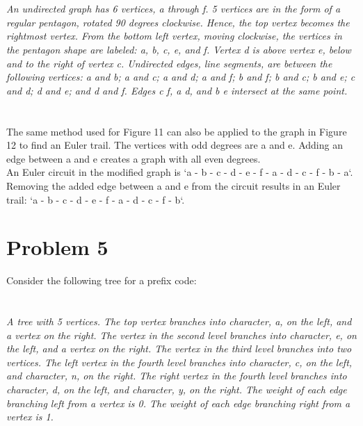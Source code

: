 \documentclass{amsart}
\theoremstyle{definition}
\theoremstyle{Exercise}
\theoremstyle{remark}
\theoremstyle{rule}
\numberwithin{equation}{section}
\begin{document}
\begin{enumerate}[label=(\alph*)]
\begin{enumerate}[label=(\roman*)]
{}
\\\\
{\color{blue}{\bf Figure 12:} \emph{An undirected graph has 6 vertices, a through f. 5 vertices are in the form of a regular pentagon, rotated 90 degrees clockwise. Hence, the top vertex becomes the rightmost vertex. From the bottom left vertex, moving clockwise, the vertices in the pentagon shape are labeled: a, b, c, e, and f. Vertex d is above vertex e, below and to the right of vertex c. Undirected edges, line segments, are between the following vertices: a and b; a and c; a and d; a and f; b and f; b and c; b and e; c and d; d and e; and d and f. Edges c f, a d, and b e intersect at the same point.
\\
}
}
\\\\
The same method used for Figure 11 can also be applied to the graph in Figure 12 to find an Euler trail. The vertices with odd degrees are a and e. Adding an edge between a and e creates a graph with all even degrees.\\
An Euler circuit in the modified graph is `a - b - c - d - e - f - a - d - c - f - b - a`.\\
Removing the added edge between a and e from the circuit results in an Euler trail: `a - b - c - d - e - f - a - d - c - f - b`.

\end{enumerate}
\end{enumerate}
 \newpage

\section*{Problem 5}

Consider the following tree for a prefix code:\\
\\\\
{\color{blue}{\bf Figure 13:} \emph{A tree with 5 vertices. The top vertex branches into character, a, on the left, and a vertex on the right. The vertex in the second level branches into character, e, on the left, and a vertex on the right. The vertex in the third level branches into two vertices. The left vertex in the fourth level branches into character, c, on the left, and character, n, on the right. The right vertex in the fourth level branches into character, d, on the left, and character, y, on the right. The weight of each edge branching left from a vertex is 0. The weight of each edge branching right from a vertex is 1.
\\
}
}
\\
\\
\end{document}
